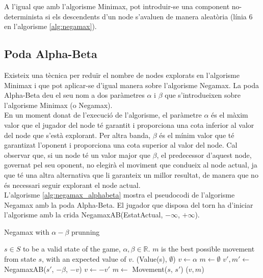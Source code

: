 \documentclass[12pt,a4paper]{article}
\begin{document}
A l'igual que amb l'algorisme Minimax, pot introduir-se una component no-determinista si els descendents d'un node s'avaluen de manera aleatòria (línia 6 en l'algorisme \ref{alg:negamax}).\\

\subsection{Poda Alpha-Beta}
Existeix una tècnica per reduïr el nombre de nodes explorats en l'algorisme Minimax\cite{richards1961alpha} i que pot aplicar-se d'igual manera sobre l'algorisme Negamax\cite{knuth1976analysis}. La poda Alpha-Beta deu el seu nom a dos paràmetres $\alpha$ i $\beta$ que s'introdueixen sobre l'algorisme Minimax (o Negamax). \\

En un moment donat de l'execució de l'algorisme, el paràmetre $\alpha$ és el màxim valor que el jugador del node té garantit i proporciona una cota inferior al valor del node que s'està explorant. Per altra banda, $\beta$ és el mínim valor que té garantizat l'oponent i proporciona una cota superior al valor del node. Cal observar que, si un node té un valor major que $\beta$, el predecessor d'aquest node, governat pel seu oponent, no elegirà el moviment que condueix al node actual, ja que té una altra alternativa que li garanteix un millor resultat, de manera que no és necessari seguir explorant el node actual.\\

L'algorisme \ref{alg:negamax_alphabeta} mostra el pseudocodi de l'algorisme Negamax amb la poda Alpha-Beta. El jugador que disposa del torn ha d'iniciar l'algorisme amb la crida NegamaxAB(EstatActual, $-\infty$, $+\infty$).

\begin{algorithm}[H]
\caption{Negamax with $\alpha-\beta$ prunning}
\label{alg:negamax_alphabeta}
\begin{algorithmic}[5]
\Require $s \in S$ to be a valid state of the game, $\alpha,\beta \in \mathbb{R}$.
\Ensure $m$ is the best possible movement from state $s$, with an expected value of $v$. 
	\State \Return (Value(s), $\emptyset$)
\Else
	\State $v \leftarrow \alpha$
	\State $m \leftarrow \emptyset$
		\State $v',m' \leftarrow$ NegamaxAB($s'$, $-\beta$, $-v$)
			\State $v \leftarrow -v'$
			\State $m \leftarrow$ Movement($s$, $s'$)
		\EndIf
	\EndFor
	\State \Return ($v, m$)
\EndIf
\end{algorithmic}
\end{algorithm}
\end{document}

